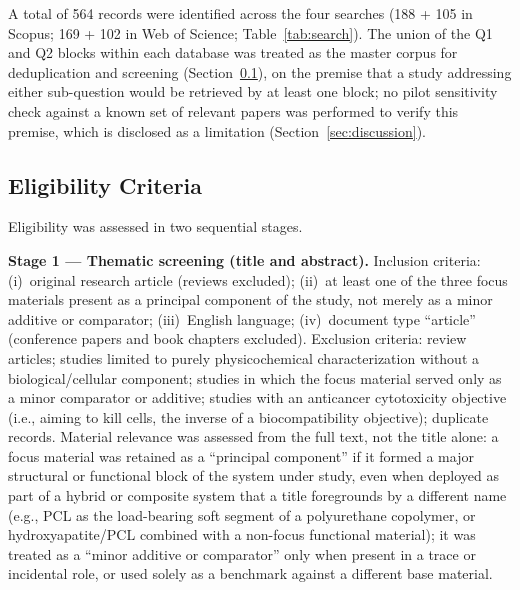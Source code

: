 \documentclass[5p,times,twocolumn]{elsarticle}
\begin{document}
A total of 564 records were identified across the four searches (188 + 105 in Scopus; 169 + 102 in Web of Science; Table~\ref{tab:search}). The union of the Q1 and Q2 blocks within each database was treated as the master corpus for deduplication and screening (Section~\ref{sec:eligibility}), on the premise that a study addressing either sub-question would be retrieved by at least one block; no pilot sensitivity check against a known set of relevant papers was performed to verify this premise, which is disclosed as a limitation (Section~\ref{sec:discussion}).

\subsection{Eligibility Criteria}
\label{sec:eligibility}

Eligibility was assessed in two sequential stages.

\textbf{Stage 1 --- Thematic screening (title and abstract).} Inclusion criteria: (i)~original research article (reviews excluded); (ii)~at least one of the three focus materials present as a principal component of the study, not merely as a minor additive or comparator; (iii)~English language; (iv)~document type ``article'' (conference papers and book chapters excluded). Exclusion criteria: review articles; studies limited to purely physicochemical characterization without a biological/cellular component; studies in which the focus material served only as a minor comparator or additive; studies with an anticancer cytotoxicity objective (i.e., aiming to kill cells, the inverse of a biocompatibility objective); duplicate records. Material relevance was assessed from the full text, not the title alone: a focus material was retained as a ``principal component'' if it formed a major structural or functional block of the system under study, even when deployed as part of a hybrid or composite system that a title foregrounds by a different name (e.g., PCL as the load-bearing soft segment of a polyurethane copolymer, or hydroxyapatite/PCL combined with a non-focus functional material); it was treated as a ``minor additive or comparator'' only when present in a trace or incidental role, or used solely as a benchmark against a different base material.
\end{document}
